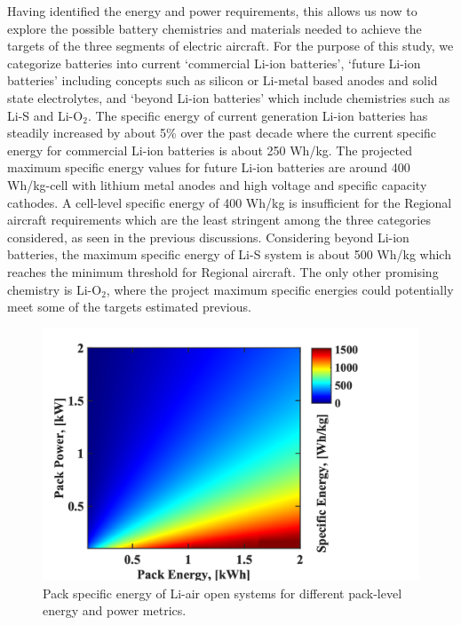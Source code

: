 \documentclass{achemso}
\newcommand{\abattention}[1]{{\textbf{\textcolor{Orange}{Alec: #1}}}}
\begin{document}
Having identified the energy and power requirements, this allows us now to explore the possible battery chemistries and materials needed to achieve the targets of the three segments of electric aircraft.  For the purpose of this study, we categorize batteries into current `commercial Li-ion batteries', `future Li-ion batteries' including concepts such as silicon or Li-metal based anodes and solid state electrolytes, and `beyond Li-ion batteries' which include chemistries such as Li-S and Li-O$\mathrm{_2}$. The specific energy of current generation Li-ion batteries has steadily increased by about 5\% over the past decade\cite{placke2017lithium} where the current specific energy for commercial Li-ion batteries is about 250 Wh/kg. The projected maximum specific energy values for future Li-ion batteries are around 400 Wh/kg-cell\cite{placke2017lithium} with lithium metal anodes and high voltage and specific capacity cathodes. A cell-level specific energy of 400 Wh/kg is insufficient for the Regional aircraft requirements which are the least stringent among the three categories considered, as seen in the previous discussions. Considering beyond Li-ion batteries, the maximum specific energy of Li-S system is about 500 Wh/kg which reaches the minimum threshold for Regional aircraft. The only other promising chemistry is Li-O$\mathrm{_2}$, where the project maximum specific energies could potentially meet some of the targets estimated previous.

\begin{figure}[h!]
\centering
\includegraphics[width=0.7\linewidth]{ragone.png}
\caption{Pack specific energy of Li-air open systems for different pack-level energy and power metrics.}
\label{fig:ragone} 
\end{figure} 
\end{document}
